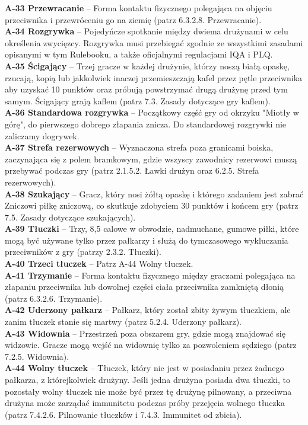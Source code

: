 \documentclass[12pt,a4paper]{article}
\begin{document}
\textbf{A-33 Przewracanie} – Forma kontaktu fizycznego polegająca na objęciu przeciwnika i przewróceniu go na ziemię (patrz 6.3.2.8. Przewracanie).\\
\textbf{A-34 Rozgrywka} – Pojedyńcze spotkanie między dwiema drużynami w celu określenia zwycięzcy. Rozgrywka musi przebiegać zgodnie ze wszystkimi zasadami opisanymi w tym Rulebooku, a także oficjalnymi regulacjami IQA i PLQ.\\
\textbf{A-35 Ścigający} – Trzej gracze w każdej drużynie, którzy noszą białą opaskę, rzucają, kopią lub jakkolwiek inaczej przemieszczają kafel przez pętle przeciwnika aby uzyskać 10 punktów oraz próbują powstrzymać drugą drużynę przed tym samym. Ścigający grają kaflem (patrz 7.3. Zasady dotyczące gry kaflem).\\
\textbf{A-36 Standardowa rozgrywka} – Początkowy część gry od okrzyku "Miotły w górę", do pierwszego dobrego złapania znicza. Do standardowej rozgrywki nie zaliczamy dogrywek.\\
\textbf{A-37 Strefa rezerwowych} – Wyznaczona strefa poza granicami boiska, zaczynająca się z polem bramkowym, gdzie wszyscy zawodnicy rezerwowi muszą przebywać podczas gry (patrz 2.1.5.2. Ławki drużyn oraz 6.2.5. Strefa rezerwowych).\\
\textbf{A-38 Szukający} – Gracz, który nosi żółtą opaskę i którego zadaniem jest zabrać Zniczowi piłkę zniczową, co skutkuje zdobyciem 30 punktów i końcem gry (patrz 7.5. Zasady dotyczące szukających).\\
\textbf{A-39 Tłuczki} – Trzy, 8,5 calowe w obwodzie, nadmuchane, gumowe piłki, które mogą być używane tylko przez pałkarzy i służą do tymczasowego wykluczania przeciwników z gry (patrzy 2.3.2. Tłuczki).\\
\textbf{A-40 Trzeci tłuczek} – Patrz A-44 Wolny tłuczek.\\
\textbf{A-41 Trzymanie} – Forma kontaktu fizycznego między graczami polegająca na złapaniu przeciwnika lub dowolnej części ciała przeciwnika zamkniętą dłonią (patrz 6.3.2.6. Trzymanie).\\
\textbf{A-42 Uderzony pałkarz} – Pałkarz, który został zbity żywym tłuczkiem, ale zanim tłuczek stanie się martwy (patrz 5.2.4. Uderzony pałkarz).\\
\textbf{A-43 Widownia} – Przestrzeń poza obszarem gry, gdzie mogą znajdować się widzowie. Gracze mogą wejść na widownię tylko za pozwoleniem sędziego (patrz 7.2.5. Widownia).\\
\textbf{A-44 Wolny tłuczek} – Tłuczek, który nie jest w posiadaniu przez żadnego pałkarza, z którejkolwiek drużyny. Jeśli jedna drużyna posiada dwa tłuczki, to pozostały wolny tłuczek nie może być przez tę drużynę pilnowany, a przeciwna drużyna może zarządać immunitetu podczas próby przejęcia wolnego tłuczka (patrz 7.4.2.6. Pilnowanie tłuczków i 7.4.3. Immunitet od zbicia).\\
\end{document}
